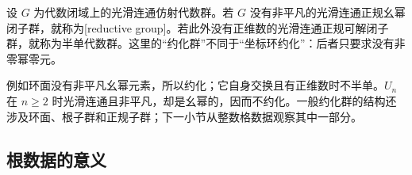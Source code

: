 \begin{definition}\label{b5:def:reductive-group}
	设 \(G\) 为代数闭域上的光滑连通仿射代数群。若 \(G\) 没有非平凡的光滑连通正规幺幂闭子群，就称为[reductive group]。若此外没有正维数的光滑连通正规可解闭子群，就称为半单代数群。这里的“约化群”不同于“坐标环约化”：后者只要求没有非零幂零元。
\end{definition}
例如环面没有非平凡幺幂元素，所以约化；它自身交换且有正维数时不半单。\(U_n\) 在 \(n\ge2\) 时光滑连通且非平凡，却是幺幂的，因而不约化。一般约化群的结构还涉及环面、根子群和正规子群；下一小节从整数格数据观察其中一部分。

\subsection{根数据的意义}
\label{b5:subsec:2104:02}


